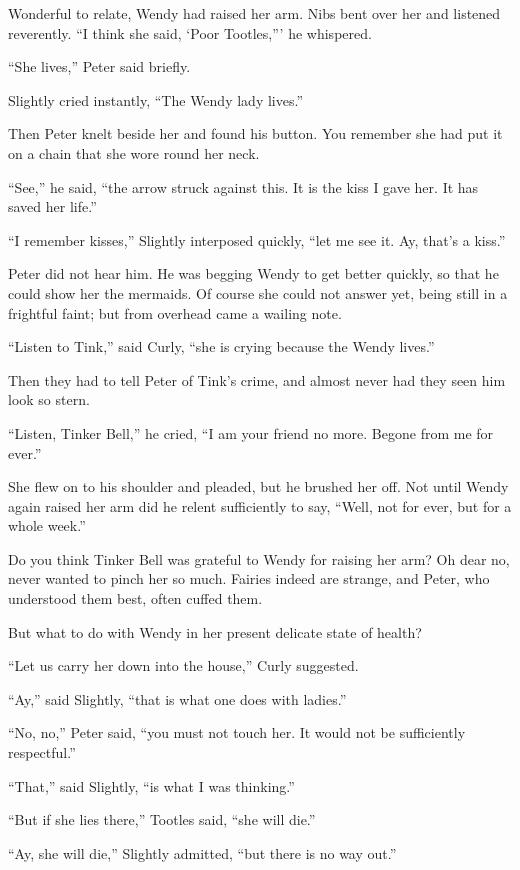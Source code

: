 Wonderful to relate, Wendy had raised her arm.
Nibs bent over her and listened reverently. ``I think she said,
‘Poor Tootles,''' he whispered.

``She lives,'' Peter said briefly.

Slightly cried instantly, ``The Wendy lady lives.''

Then Peter knelt beside her and found his button.
You remember she had put it on a chain that she wore round her neck.

``See,'' he said, ``the arrow struck against this.
It is the kiss I gave her.
It has saved her life.''

``I remember kisses,'' Slightly interposed quickly, ``let me see it.
Ay, that's a kiss.''

Peter did not hear him.
He was begging Wendy to get better quickly, so that he could show her the
mermaids.
Of course she could not answer yet, being still in a frightful faint; but from
overhead came a wailing note.

``Listen to Tink,'' said Curly, ``she is crying because the Wendy lives.''

Then they had to tell Peter of Tink's crime, and almost never had they seen him
look so stern.

``Listen, Tinker Bell,'' he cried, ``I am your friend no more.
Begone from me for ever.''

She flew on to his shoulder and pleaded, but he brushed her off.
Not until Wendy again raised her arm did he relent sufficiently to say,
``Well, not for ever, but for a whole week.''

Do you think Tinker Bell was grateful to Wendy for raising her arm?
Oh dear no, never wanted to pinch her so much.
Fairies indeed are strange, and Peter, who understood them best, often cuffed
them.

But what to do with Wendy in her present delicate state of health?

``Let us carry her down into the house,'' Curly suggested.

``Ay,'' said Slightly, ``that is what one does with ladies.''

``No, no,'' Peter said, ``you must not touch her.
It would not be sufficiently respectful.''

``That,'' said Slightly, ``is what I was thinking.''

``But if she lies there,'' Tootles said, ``she will die.''

``Ay, she will die,'' Slightly admitted, ``but there is no way out.''

